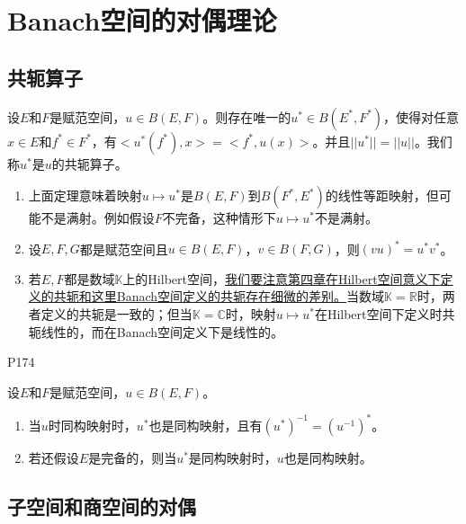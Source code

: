 \section{Banach空间的对偶理论}
\subsection{共轭算子}

\begin{theorem}
    设$E$和$F$是赋范空间，$u\in B(E,F)$。则存在唯一的$u^{*}\in B(E^{*},F^{*})$，使得对任意$x\in E$和$f^{*}\in F^{*}$，有$<u^{*}(f^{*}),x>=<f^{*},u(x)>$。并且$||u^{*}||=||u||$。我们称$u^{*}$是$u$的共轭算子。
\end{theorem}

\original
{
    \begin{enumerate}
        \item 上面定理意味着映射$u\mapsto u^{*}$是$B(E,F)$到$B(F^{*},E^{*})$的线性等距映射，但可能不是满射。例如假设$F$不完备，这种情形下$u\mapsto u^{*}$不是满射。
        \item 设$E,F,G$都是赋范空间且$u\in B(E,F)$，$v\in B(F,G)$，则$(vu)^{*}=u^{*}v^{*}$。
        \item 若$E,F$都是数域$\mathbb{K}$上的Hilbert空间，\uline{我们要注意第四章在Hilbert空间意义下定义的共轭和这里Banach空间定义的共轭存在细微的差别。}当数域$\mathbb{K}=\mathbb{R}$时，两者定义的共轭是一致的；但当$\mathbb{K}=\mathbb{C}$时，映射$u\mapsto u^{*}$在Hilbert空间下定义时共轭线性的，而在Banach空间定义下是线性的。
    \end{enumerate}
}
{P174}
\begin{proposition}
    
\end{proposition}


\begin{theorem}
    设$E$和$F$是赋范空间，$u\in B(E,F)$。
    \begin{enumerate}
        \item 当$u$时同构映射时，$u^{*}$也是同构映射，且有$(u^{*})^{-1}=(u^{-1})^{*}$。
        \item 若还假设$E$是完备的，则当$u^{*}$是同构映射时，$u$也是同构映射。
    \end{enumerate}
\end{theorem}

\subsection{子空间和商空间的对偶}

